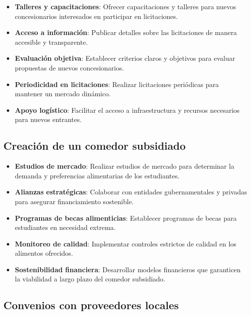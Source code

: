 \documentclass[letterpaper, 11pt]{report}
\begin{document}
\begin{itemize}
      \item \textbf{Talleres y capacitaciones}: Ofrecer capacitaciones y talleres para nuevos
            concesionarios interesados en participar en licitaciones.
      \item \textbf{Acceso a información}: Publicar detalles sobre las licitaciones de manera
            accesible y transparente.
      \item \textbf{Evaluación objetiva}: Establecer criterios claros y objetivos para evaluar
            propuestas de nuevos concesionarios.
      \item \textbf{Periodicidad en licitaciones}: Realizar licitaciones periódicas para mantener un
            mercado dinámico.
      \item \textbf{Apoyo logístico}: Facilitar el acceso a infraestructura y recursos necesarios
            para nuevos entrantes.

\end{itemize}

\subsection{Creación de un comedor subsidiado}

\begin{itemize}
      \item \textbf{Estudios de mercado}: Realizar estudios de mercado para determinar la demanda y
            preferencias alimentarias de los estudiantes.
      \item \textbf{Alianzas estratégicas}: Colaborar con entidades gubernamentales y privadas para
            asegurar financiamiento sostenible.
      \item \textbf{Programas de becas alimenticias}: Establecer programas de becas para estudiantes
            en necesidad extrema.
      \item \textbf{Monitoreo de calidad}: Implementar controles estrictos de calidad en los
            alimentos ofrecidos.
      \item \textbf{Sostenibilidad financiera}: Desarrollar modelos financieros que garanticen la
            viabilidad a largo plazo del comedor subsidiado.

\end{itemize}

\subsection{Convenios con proveedores locales}
\end{document}
